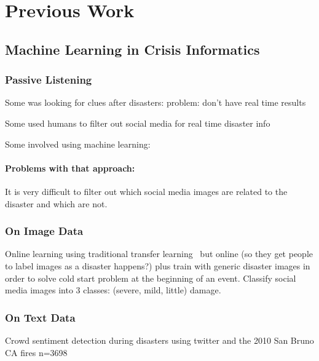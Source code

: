 \chapter{Previous Work}

\section{Machine Learning in Crisis Informatics}

\subsection{Passive Listening}

Some was looking for clues after disasters:
\cite{viewegMicrobloggingTwoNatural2010}
problem: don't have real time results

Some used humans to filter out social media for real time disaster info
\cite{starbirdVoluntweetersSelforganizingDigital}
\cite{meierDigitalHumanitariansHow2015}

Some involved using machine learning:
\cite{imranPracticalExtractionDisasterrelevant2013}
\subsubsection{Problems with that approach:}
It is very difficult to filter out which social media images are related to the
disaster and which are not.



\subsection{On Image Data}
Online learning using traditional transfer
learning~\cite{donahueDeCAFDeepConvolutional2013} but online (so they get people
to label images as a disaster happens?) plus train with generic disaster
images in order to solve cold start problem at the beginning of an event.
Classify social media images into 3 classes: (severe, mild, little) damage.
\cite{nguyenDamageAssessmentSocial2017}



\subsection{On Text Data}\label{chap3:text}
Crowd sentiment detection during disasters using twitter and the 2010 San Bruno
CA fires n=3698
\cite{nagyCrowdSentimentDetection2012}

